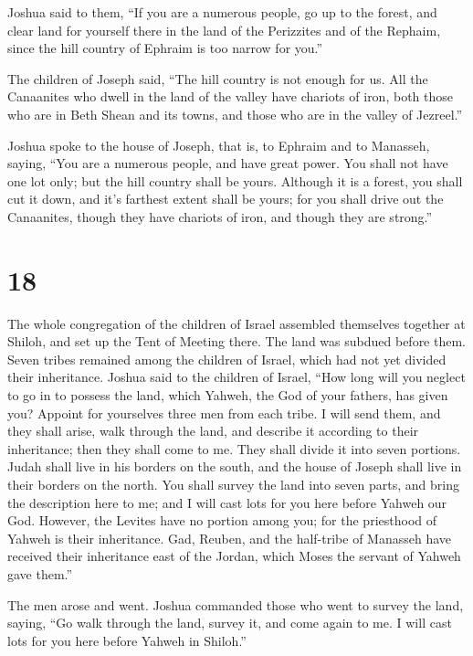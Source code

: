  Joshua said to them, ``If you are a numerous people, go up
to the forest, and clear land for yourself there in the land of the
Perizzites and of the Rephaim, since the hill country of Ephraim is too
narrow for you.''

 The children of Joseph said, ``The hill country is not
enough for us. All the Canaanites who dwell in the land of the valley
have chariots of iron, both those who are in Beth Shean and its towns,
and those who are in the valley of Jezreel.''

 Joshua spoke to the house of Joseph, that is, to Ephraim
and to Manasseh, saying, ``You are a numerous people, and have great
power. You shall not have one lot only;  but the hill
country shall be yours. Although it is a forest, you shall cut it down,
and it's farthest extent shall be yours; for you shall drive out the
Canaanites, though they have chariots of iron, and though they are
strong.''

\hypertarget{section-17}{%
\section{18}\label{section-17}}

 The whole congregation of the children of Israel assembled
themselves together at Shiloh, and set up the Tent of Meeting there. The
land was subdued before them.  Seven tribes remained among
the children of Israel, which had not yet divided their inheritance.
 Joshua said to the children of Israel, ``How long will you
neglect to go in to possess the land, which Yahweh, the God of your
fathers, has given you?  Appoint for yourselves three men
from each tribe. I will send them, and they shall arise, walk through
the land, and describe it according to their inheritance; then they
shall come to me.  They shall divide it into seven portions.
Judah shall live in his borders on the south, and the house of Joseph
shall live in their borders on the north.  You shall survey
the land into seven parts, and bring the description here to me; and I
will cast lots for you here before Yahweh our God.  However,
the Levites have no portion among you; for the priesthood of Yahweh is
their inheritance. Gad, Reuben, and the half-tribe of Manasseh have
received their inheritance east of the Jordan, which Moses the servant
of Yahweh gave them.''

 The men arose and went. Joshua commanded those who went to
survey the land, saying, ``Go walk through the land, survey it, and come
again to me. I will cast lots for you here before Yahweh in Shiloh.''


